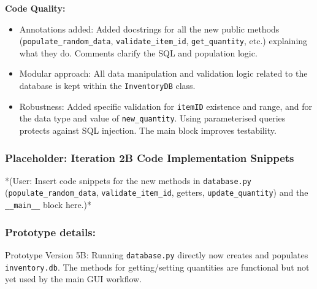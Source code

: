 \textbf{Code Quality:}
\begin{itemize}
	\item Annotations added: Added docstrings for all the new public methods (\verb|populate_random_data|, \verb|validate_item_id|, \verb|get_quantity|, etc.) explaining what they do. Comments clarify the SQL and population logic.
	\item Modular approach: All data manipulation and validation logic related to the database is kept within the \verb|InventoryDB| class.
	\item Robustness: Added specific validation for \verb|itemID| existence and range, and for the data type and value of \verb|new_quantity|. Using parameterised queries protects against SQL injection. The main block improves testability.
\end{itemize}

\newpage
\subsubsection*{Placeholder: Iteration 2B Code Implementation Snippets}
*(User: Insert code snippets for the new methods in \verb|database.py| (\verb|populate_random_data|, \verb|validate_item_id|, getters, \verb|update_quantity|) and the \verb|__main__| block here.)*
\newpage

\subsubsection{Prototype details:}
Prototype Version 5B: Running \verb|database.py| directly now creates and populates \verb|inventory.db|. The methods for getting/setting quantities are functional but not yet used by the main GUI workflow.

